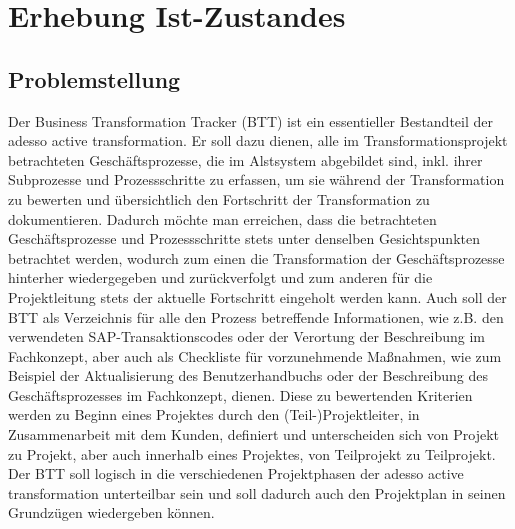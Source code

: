 \section{Erhebung Ist-Zustandes}
\label{kap:istzustand}
\subsection{Problemstellung}
Der Business Transformation Tracker (BTT) ist ein essentieller Bestandteil der adesso active transformation. Er soll dazu dienen, alle im Transformationsprojekt betrachteten Geschäftsprozesse, die im Alstsystem abgebildet sind, inkl. ihrer Subprozesse und Prozessschritte zu erfassen, um sie während der Transformation zu bewerten und übersichtlich den Fortschritt der Transformation zu dokumentieren. Dadurch möchte man erreichen, dass die betrachteten Geschäftsprozesse und Prozessschritte stets unter denselben Gesichtspunkten betrachtet werden, wodurch zum einen die Transformation der Geschäftsprozesse hinterher wiedergegeben und zurückverfolgt und zum anderen für die Projektleitung stets der aktuelle Fortschritt eingeholt werden kann. Auch soll der BTT als Verzeichnis für alle den Prozess betreffende Informationen, wie z.B. den verwendeten SAP-Transaktionscodes oder der Verortung der Beschreibung im Fachkonzept, aber auch als Checkliste für vorzunehmende Maßnahmen, wie zum Beispiel der Aktualisierung des Benutzerhandbuchs oder der Beschreibung des Geschäftsprozesses im Fachkonzept, dienen. Diese zu bewertenden Kriterien werden zu Beginn eines Projektes durch den (Teil-)Projektleiter, in Zusammenarbeit mit dem Kunden, definiert und unterscheiden sich von Projekt zu Projekt, aber auch innerhalb eines Projektes, von Teilprojekt zu Teilprojekt. Der BTT soll logisch in die verschiedenen Projektphasen der adesso active transformation unterteilbar sein und soll dadurch auch den Projektplan in seinen Grundzügen wiedergeben können.


